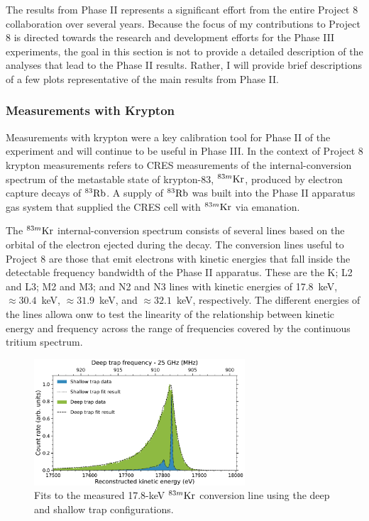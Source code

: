 The results from Phase II represents a significant effort from the entire Project 8 collaboration over several years. Because the focus of my contributions to Project 8 is directed towards the research and development efforts for the Phase III experiments, the goal in this section is not to provide a detailed description of the analyses that lead to the Phase II results. Rather, I will provide brief descriptions of a few plots representative of the main results from Phase II.

\subsubsection*{Measurements with Krypton}

Measurements with krypton were a key calibration tool for Phase II of the experiment and will continue to be useful in Phase III. In the context of Project 8 krypton measurements refers to CRES measurements of the internal-conversion spectrum of the metastable state of krypton-83, $^{83m}\rm{Kr}$, produced by electron capture decays of $^{83}\rm{Rb}$. A supply of $^{83}\rm{Rb}$ was built into the Phase II apparatus gas system that supplied the CRES cell with $^{83m}\rm{Kr}$ via emanation.

The $^{83m}\rm{Kr}$ internal-conversion spectrum consists of several lines based on the orbital of the electron ejected during the decay. The conversion lines useful to Project 8 are those that emit electrons with kinetic energies that fall inside the detectable frequency bandwidth of the Phase II apparatus. These are the K; L2 and L3; M2 and M3; and N2 and N3 lines with kinetic energies of 17.8~keV, $\approx 30.4$~keV, $\approx 31.9$~keV, and $\approx 32.1$~keV, respectively. The different energies of the lines allowa onw to test the linearity of the relationship between kinetic energy and frequency across the range of frequencies covered by the continuous tritium spectrum.

\begin{figure}[htbp]
    \centering
    \includegraphics[width=0.7\textwidth]{figs/Chapter-3/kr_fit.pdf}
    \caption{Fits to the measured 17.8-keV $^{83m}\rm{Kr}$ conversion line using the deep and shallow trap configurations. }
    \label{fig:chap3-krypton-spec-fit}
\end{figure}

